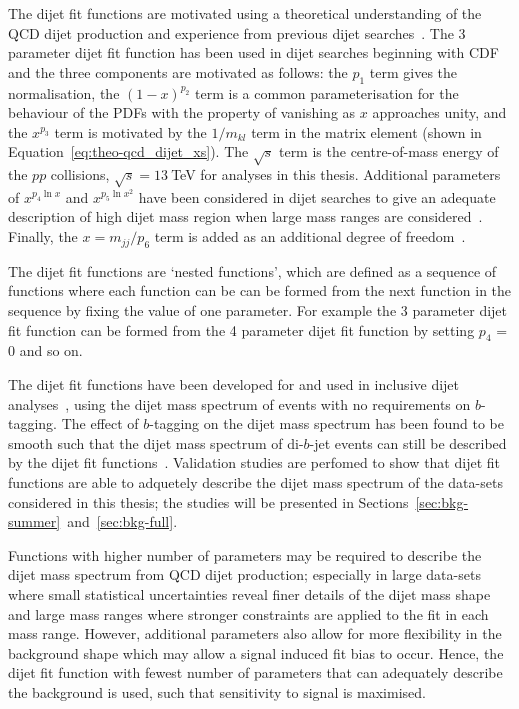 The dijet fit functions are motivated using a theoretical understanding of the QCD dijet production
and experience from previous dijet searches~\cite{theo-dijet_harris}.
The 3 parameter dijet fit function has been used in dijet searches beginning with CDF~\cite{dijet-CDF_3par}
and the three components are motivated as follows:
the $p_1$ term gives the normalisation,
the $(1-x)^{p_2}$ term is a common parameterisation for the behaviour of the PDFs with the property of vanishing as $x$ approaches unity,
and the $x^{p_3}$ term is motivated by the $1/m_{kl}$ term in the matrix element (shown in Equation~\ref{eq:theo-qcd_dijet_xs}).
The $\sqrt{s}$ term is the centre-of-mass energy of the $pp$ collisions, $\sqrt{s}=13~$TeV for analyses in this thesis.
Additional parameters of $x^{p_4\ln{x}}$ and $x^{p_5\ln{x}^{2}}$ have been considered in dijet searches to give an adequate description of
high dijet mass region when large mass ranges are considered~\cite{dijet-CDF_4par,dijet-mori16_int}.
Finally, the $x=m_{jj}/p_6$ term is added as an additional degree of freedom~\cite{det-thesis_kate}.

The dijet fit functions are `nested functions',
which are defined as a sequence of functions where each function can be can be formed from the next function in the sequence by fixing the value of one parameter.
For example the 3 parameter dijet fit function can be formed from the 4 parameter dijet fit function by setting $p_4$ = 0 and so on.

The dijet fit functions have been developed for and used in inclusive dijet analyses~\cite{theo-dijet_harris},
using the dijet mass spectrum of events with no requirements on $b$-tagging.
The effect of $b$-tagging on the dijet mass spectrum has been found to be smooth
such that the dijet mass spectrum of di-$b$-jet events can still be described by the dijet fit functions~\cite{dibjet-mori16_paper}.
Validation studies are perfomed to show that dijet fit functions are able
to adquetely describe the dijet mass spectrum of the data-sets considered in this thesis;
the studies will be presented in Sections~\ref{sec:bkg-summer}~and~\ref{sec:bkg-full}.

Functions with higher number of parameters may be required to describe the dijet mass spectrum from QCD dijet production;
especially in large data-sets where small statistical uncertainties reveal finer details of the dijet mass shape
and large mass ranges where stronger constraints are applied to the fit in each mass range.
However, additional parameters also allow for more flexibility in the background shape
which may allow a signal induced fit bias to occur.
Hence, the dijet fit function with fewest number of parameters
that can adequately describe the background is used, such that sensitivity to signal is maximised.

